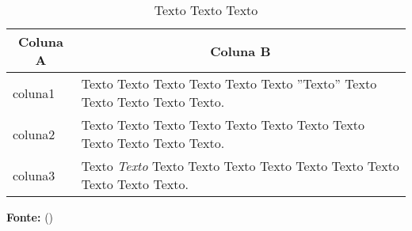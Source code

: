 

\begin{table}[ht]
\caption{Texto Texto Texto}
\label{tbl:tabelaex2}
\centering
{}
\begin{tabular}{p{6cm}p{9cm}}
\hline
\multicolumn{1}{c}{\textbf{Coluna A}} & \multicolumn{1}{c}{\textbf{Coluna B}}  \\
\hline 
coluna1 & Texto Texto Texto Texto Texto Texto ''Texto'' Texto Texto Texto Texto Texto.
\\ 

coluna2 & Texto Texto Texto Texto Texto Texto Texto Texto Texto Texto Texto Texto.              
\\

coluna3 & Texto \textit{Texto} Texto Texto Texto Texto Texto Texto Texto Texto Texto Texto.     
\\ \hline

\end{tabular}

  \par\medskip\ABNTEXfontereduzida\selectfont\textbf{Fonte:} \citeauthor{manualufpe2020} (\citeyear{manualufpe2020}) \par\medskip
\end{table}
